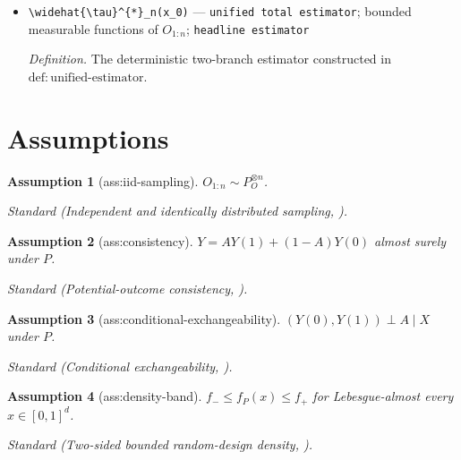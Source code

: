 \documentclass{article}
\newtheorem{assumption}{Assumption}
\begin{document}
\begin{itemize}
  \par\smallskip\noindent\emph{Definition.} On \(\mathcal R_{\mathrm{pair}}\), the estimator equals \(\widehat\tau_n^{\mathrm{pair}}(x_0)\) through \(\mathfrak H_P\).
  \item \texttt{\textbackslash{}\allowbreak{}widehat\{\textbackslash{}\allowbreak{}tau\}\allowbreak{}\textasciicircum{}\{*\}\allowbreak{}\_\allowbreak{}n(x\_\allowbreak{}0)} --- \texttt{unified total estimator}; bounded measurable functions of \(O_{1:n}\); \texttt{headline estimator}
  \par\smallskip\noindent\emph{Definition.} The deterministic two-branch estimator constructed in \(\mathrm{def:unified\mbox{-}estimator}\).
\end{itemize}

\section{Assumptions}

\begin{assumption}[ass:iid-sampling]\label{ass:iid-sampling}
\(O_{1:n}\sim P_O^{\otimes n}\).
\par\smallskip\noindent\emph{Standard} (Independent and identically distributed sampling, \cite{kennedy2024minimax}).
\end{assumption}

\begin{assumption}[ass:consistency]\label{ass:consistency}
\(Y=A Y(1)+(1-A)Y(0)\) almost surely under \(P\).
\par\smallskip\noindent\emph{Standard} (Potential-outcome consistency, \cite{kennedy2024minimax}).
\end{assumption}

\begin{assumption}[ass:conditional-exchangeability]\label{ass:conditional-exchangeability}
\((Y(0),Y(1))\perp A\mid X\) under \(P\).
\par\smallskip\noindent\emph{Standard} (Conditional exchangeability, \cite{kennedy2024minimax}).
\end{assumption}

\begin{assumption}[ass:density-band]\label{ass:density-band}
\(f_{-}\leq f_P(x)\leq f_{+}\) for Lebesgue-almost every \(x\in[0,1]^d\).
\par\smallskip\noindent\emph{Standard} (Two-sided bounded random-design density, \cite{liu2017semiparametric}).
\end{assumption}
\end{document}
